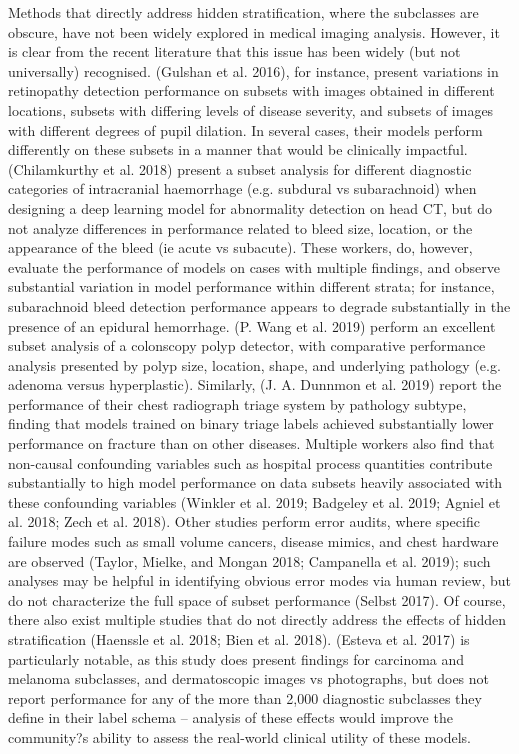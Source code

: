 \documentclass{article}
\begin{document}
Methods that directly address hidden stratification, where the subclasses are obscure, have not been widely explored in medical imaging analysis.  However, it is clear from the recent literature that this issue has been widely (but not universally) recognised.  
(Gulshan et al. 2016), for instance, present variations in retinopathy detection performance on subsets with images obtained in different locations, subsets with differing levels of disease severity, and subsets of images with different degrees of pupil dilation.  
In several cases, their models perform differently on these subsets in a manner that would be clinically impactful.  (Chilamkurthy et al. 2018)  present a subset analysis for different diagnostic categories of intracranial haemorrhage (e.g. subdural vs subarachnoid) when designing a deep learning model for abnormality detection on head CT, but do not analyze differences in  performance related to bleed size, location, or the appearance of the bleed (ie acute vs subacute). 
 These workers, do, however, evaluate the performance of models on cases with multiple findings, and observe substantial variation in model performance within different strata; for instance, subarachnoid bleed detection performance appears to degrade substantially in the presence of an epidural hemorrhage.  
 (P. Wang et al. 2019) perform an excellent subset analysis of a colonscopy polyp detector, with comparative performance analysis presented by polyp size, location, shape, and underlying pathology (e.g. adenoma versus hyperplastic).  
 Similarly, (J. A. Dunnmon et al. 2019) report the performance of their chest radiograph triage system by pathology subtype, finding that models trained on binary triage labels achieved substantially lower performance on fracture than on other diseases.   
 Multiple workers also find that non-causal confounding variables such as hospital process quantities contribute substantially to high model performance on data subsets heavily associated with these confounding variables  (Winkler et al. 2019; Badgeley et al. 2019; Agniel et al. 2018; Zech et al. 2018).  
 Other studies perform error audits, where specific failure modes such as small volume cancers, disease mimics, and chest hardware are observed (Taylor, Mielke, and Mongan 2018; Campanella et al. 2019); such analyses may be helpful in identifying obvious error modes via human review, but do not characterize the full space of subset performance (Selbst 2017).  
 Of course, there also exist multiple studies that do not directly address the effects of hidden stratification (Haenssle et al. 2018; Bien et al. 2018). 
 (Esteva et al. 2017) is particularly notable, as this study does present findings for carcinoma and melanoma subclasses, and dermatoscopic images vs photographs, but does not report performance for any of the more than 2,000 diagnostic subclasses they define in their label schema -- analysis of these effects would improve the community?s ability to assess the real-world clinical utility of these models. 
 
\end{document}
